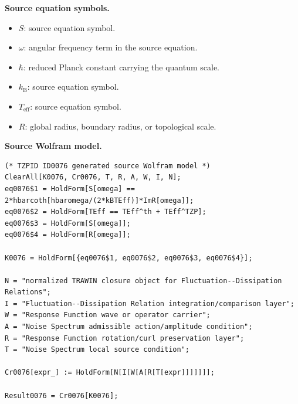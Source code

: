 \begin{minipage}[t]{0.49\linewidth}
\begingroup
\small
\raggedright
\textbf{Source equation symbols.}\par
\begin{itemize}[leftmargin=1.35em,itemsep=1pt,topsep=1pt,parsep=0pt]
    \item $S$: source equation symbol.
    \item $\omega$: angular frequency term in the source equation.
    \item $\hbar$: reduced Planck constant carrying the quantum scale.
    \item $k_{\mathrm{B}}$: source equation symbol.
    \item $T_{\mathrm{eff}}$: source equation symbol.
    \item $R$: global radius, boundary radius, or topological scale.
\end{itemize}
\endgroup
\end{minipage}\hfill
\begin{minipage}[t]{0.47\linewidth}
\begingroup
\scriptsize
\raggedright
\textbf{Source Wolfram model.}\par
\begin{Verbatim}[fontsize=\tiny,breaklines=true,breakanywhere=true]
(* TZPID ID0076 generated source Wolfram model *)
ClearAll[K0076, Cr0076, T, R, A, W, I, N];
eq0076$1 = HoldForm[S[omega] == 2*hbarcoth[hbaromega/(2*kBTEff)]*ImR[omega]];
eq0076$2 = HoldForm[TEff == TEff^th + TEff^TZP];
eq0076$3 = HoldForm[S[omega]];
eq0076$4 = HoldForm[R[omega]];

K0076 = HoldForm[{eq0076$1, eq0076$2, eq0076$3, eq0076$4}];

N = "normalized TRAWIN closure object for Fluctuation--Dissipation Relations";
I = "Fluctuation--Dissipation Relation integration/comparison layer";
W = "Response Function wave or operator carrier";
A = "Noise Spectrum admissible action/amplitude condition";
R = "Response Function rotation/curl preservation layer";
T = "Noise Spectrum local source condition";

Cr0076[expr_] := HoldForm[N[I[W[A[R[T[expr]]]]]]];

Result0076 = Cr0076[K0076];
\end{Verbatim}
\endgroup
\end{minipage}

